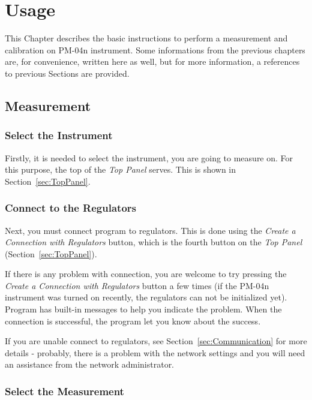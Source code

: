 \documentclass[a4paper,11pt,oneside]{report}
\theoremstyle{named}
\begin{document}
\chapter{Usage}
\label{ch:Usage}

This Chapter describes the basic instructions to perform a measurement and
calibration on PM-04n instrument. Some informations from the previous chapters
are, for convenience, written here as well, but for more information, a
references to previous Sections are provided.  

\section{Measurement}
\label{sec:Measurement}

\subsection{Select the Instrument}

Firstly, it is needed to select the instrument, you are going to measure on.
For this purpose, the top of the \textit{Top Panel} serves. This is shown in
Section~\ref{sec:TopPanel}.

\subsection{Connect to the Regulators}

Next, you must connect program to regulators. This is done using the
\textit{Create a Connection with Regulators} button, which is the fourth button
on the \textit{Top Panel} (Section~\ref{sec:TopPanel}).

If there is any problem with connection, you are welcome to try pressing the
\textit{Create a Connection with Regulators} button a few times (if the PM-04n
instrument was turned on recently, the regulators can not be initialized yet).
Program has built-in messages to help you indicate the problem. When the
connection is successful, the program let you know about the success.

If you are unable connect to regulators, see Section~\ref{sec:Communication} for
more details - probably, there is a problem with the network settings and you will
need an assistance from the network administrator. 

\subsection{Select the Measurement}
\label{sec:SelectMeasurement}
\end{document}
